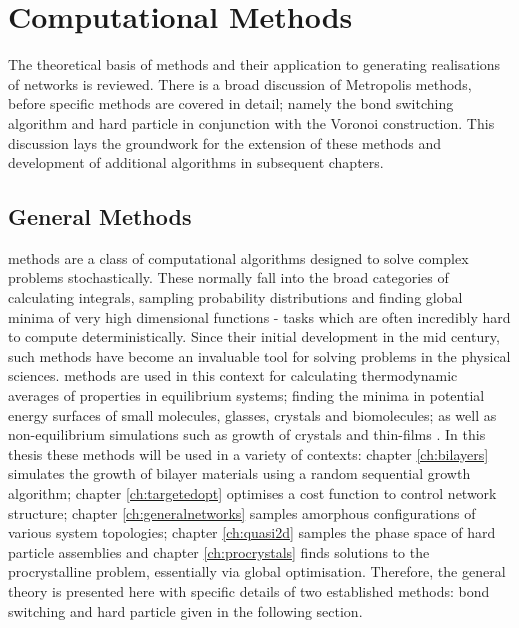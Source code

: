 \chapter{Computational Methods}
\label{ch:compmethods}

\begin{chapterabstract}
The theoretical basis of \mc{} methods and their application to generating realisations of \td{} networks is reviewed.
There is a broad discussion of Metropolis \mc{} methods, before specific methods are covered in detail; namely the bond switching algorithm and hard particle \mc{} in conjunction with the Voronoi construction.
This discussion lays the groundwork for the extension of these methods and development of additional \mc{} algorithms in subsequent chapters.
\end{chapterabstract}

\section{General \mc{} Methods}
\label{sec:mc}

\mc{} methods are a class of computational algorithms designed to solve complex problems stochastically.
These normally fall into the broad categories of calculating integrals, sampling probability distributions and finding global minima of very high dimensional functions \-- tasks which are often incredibly hard to compute deterministically.
Since their initial development in the mid\th{} century, such methods have become an invaluable tool for solving problems in the physical sciences.
\mc{} methods are used in this context for calculating thermodynamic averages of properties in equilibrium systems; finding the minima in potential energy surfaces of small molecules, glasses, crystals and biomolecules; as well as non\--equilibrium simulations such as growth of crystals and thin\--films \cite{Landau2014,Wales1999,Levi1997,Ratsch2003,Kob1999,Jensen1999}.
In this thesis these \mc{} methods  will be used in a variety of contexts: chapter \ref{ch:bilayers} simulates the growth of bilayer materials using  a random sequential growth algorithm; chapter \ref{ch:targetedopt} optimises a cost function to control network structure; chapter \ref{ch:generalnetworks} samples amorphous configurations of various system topologies; chapter \ref{ch:quasi2d} samples the phase space of hard particle assemblies and chapter \ref{ch:procrystals} finds solutions to the procrystalline problem, essentially via global optimisation.
Therefore, the general theory is presented here with specific details of two established methods: bond switching and hard particle \mc{} given in the following section.

